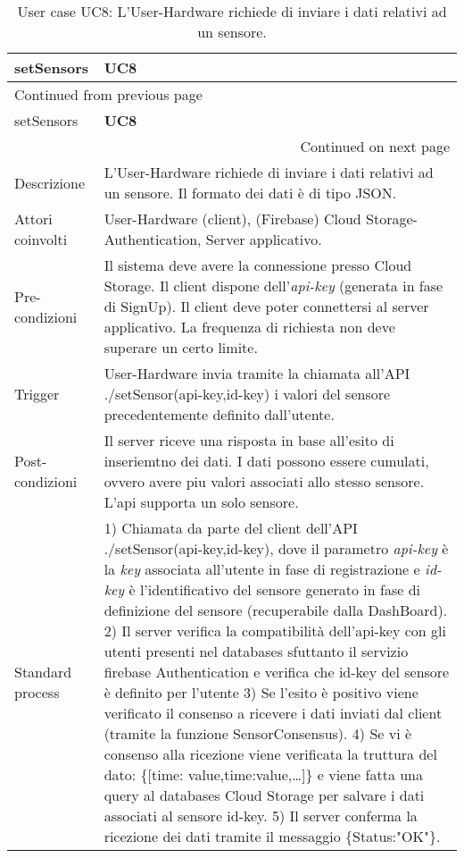 \documentclass[onecolumn,a4paper]{article}
\begin{document}
\begin{longtable}{|l|p{9.7cm}|}
\caption{User case UC8: L'User-Hardware richiede di inviare i dati relativi ad un sensore.}
\\
\cellcolor{grey!15}setSensors & \cellcolor{grey!15} \textbf{UC8}\\
\hline
\endfirsthead
\multicolumn{2}{l}{Continued from previous page} \\
\hline

\cellcolor{grey!15}setSensors & \cellcolor{grey!15} \textbf{UC8} \\

\hline
\endhead
\hline\multicolumn{2}{r}{Continued on next page} \\
\endfoot
\endlastfoot
\hline
Descrizione & L'User-Hardware richiede di inviare i dati relativi ad un sensore. Il formato dei dati è di tipo JSON.\\
\hline
Attori coinvolti & User-Hardware (client), (Firebase) Cloud Storage-Authentication, Server applicativo.\\
\hline
Pre-condizioni & Il sistema deve avere la connessione presso Cloud Storage. Il client dispone dell'\emph{api-key} (generata in fase di SignUp). Il client deve poter connettersi al server applicativo. La frequenza di richiesta non deve superare un certo limite.\\
\hline
Trigger & User-Hardware invia tramite la chiamata all'API ./setSensor(api-key,id-key) i valori del sensore precedentemente definito dall'utente.\\
\hline
Post-condizioni & Il server riceve una risposta in base all'esito di inseriemtno dei dati. I dati possono essere cumulati, ovvero avere piu valori associati allo stesso sensore. L'api supporta un solo sensore.\\
\hline
Standard process & 1) Chiamata da parte del client dell'API ./setSensor(api-key,id-key), dove il parametro \emph{api-key} è la \emph{key} associata all'utente in fase di registrazione e \emph{id-key} è l'identificativo del sensore generato in fase di definizione del sensore (recuperabile dalla DashBoard). 2) Il server verifica la compatibilità dell'api-key con gli utenti presenti nel databases sfuttanto il servizio firebase Authentication e verifica che id-key del sensore è definito per l'utente 3) Se l'esito è positivo viene verificato il consenso a ricevere i dati inviati dal client (tramite la funzione SensorConsensus). 4) Se vi è consenso alla ricezione viene verificata la truttura del dato: \{[time: value,time:value,\ldots{}]\} e viene fatta una query al databases Cloud Storage per salvare i dati associati al sensore id-key. 5) Il server conferma la ricezione dei dati tramite il messaggio \{Status:"OK"\}.\\

\end{longtable}
\end{document}
